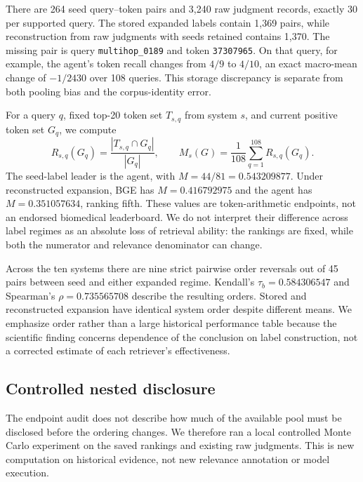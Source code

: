 \documentclass{article}
\begin{document}
There are 264 seed query--token pairs and 3,240 raw judgment records, exactly 30 per supported query. The stored expanded labels contain 1,369 pairs, while reconstruction from raw judgments with seeds retained contains 1,370. The missing pair is query \texttt{multihop\_0189} and token \texttt{37307965}. On that query, for example, the agent's token recall changes from $4/9$ to $4/10$, an exact macro-mean change of $-1/2430$ over 108 queries. This storage discrepancy is separate from both pooling bias and the corpus-identity error.

For a query $q$, fixed top-20 token set $T_{s,q}$ from system $s$, and current positive token set $G_q$, we compute
\begin{equation}
 R_{s,q}(G_q)=\frac{|T_{s,q}\cap G_q|}{|G_q|},\qquad
 M_s(G)=\frac{1}{108}\sum_{q=1}^{108}R_{s,q}(G_q).
 \label{eq:recall}
\end{equation}
The seed-label leader is the agent, with $M=44/81=0.543209877$. Under reconstructed expansion, BGE has $M=0.416792975$ and the agent has $M=0.351057634$, ranking fifth. These values are token-arithmetic endpoints, not an endorsed biomedical leaderboard. We do not interpret their difference across label regimes as an absolute loss of retrieval ability: the rankings are fixed, while both the numerator and relevance denominator can change.

Across the ten systems there are nine strict pairwise order reversals out of 45 pairs between seed and either expanded regime. Kendall's $\tau_b=0.584306547$ and Spearman's $\rho=0.735565708$ describe the resulting orders. Stored and reconstructed expansion have identical system order despite different means. We emphasize order rather than a large historical performance table because the scientific finding concerns dependence of the conclusion on label construction, not a corrected estimate of each retriever's effectiveness.

\subsection{Controlled nested disclosure}
\label{sec:disclosure}
The endpoint audit does not describe how much of the available pool must be disclosed before the ordering changes. We therefore ran a local controlled Monte Carlo experiment on the saved rankings and existing raw judgments. This is new computation on historical evidence, not new relevance annotation or model execution.
\end{document}
